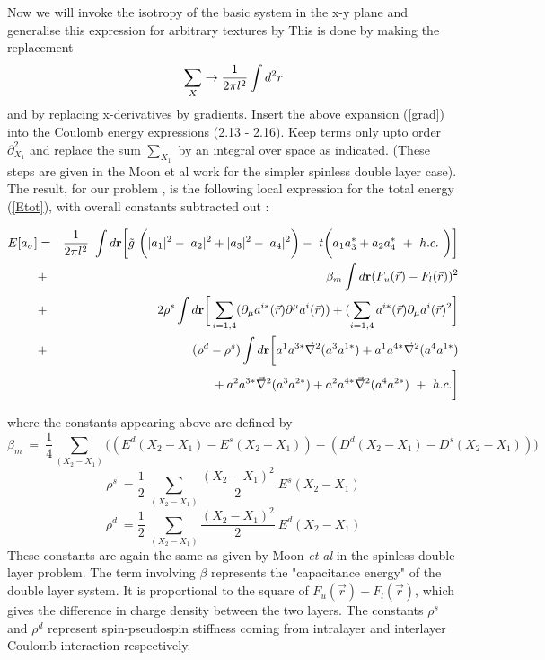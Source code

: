 Now we will invoke the isotropy of the basic system in the x-y plane
and generalise this expression for arbitrary textures by
This is done by
making the replacement
\begin{equation} \sum_{X} \rightarrow{1 \over 2\pi l^{2}} \int d^{2}r \end{equation}
and by replacing x-derivatives by gradients. 
Insert the above expansion (\ref{grad}) into the Coulomb energy 
expressions (2.13 - 2.16). 
Keep terms only upto order $\partial_{X_{1}}^2$ and replace the sum
$\sum_{X_{1}}$ by an integral over space as indicated. (These
steps are given in the Moon et al work \cite{Moon} for the simpler
spinless double layer case). The result, for our problem , is the following
local expression for the total energy (\ref{Etot}), with overall constants
subtracted out :

\begin{eqnarray} E [a_{\sigma}]
& = & 
\frac{1}{2 \pi l^{2}} \ \int d{\bf r} \bigg[ \tilde{g} \ 
\bigg(|a_{1}|^{2} - |a_{2}|^{2} + 
|a_{3}|^{2} - |a_{4}|^{2} \bigg) 
- \ t \bigg(a_{1} a_{3}^{*} + 
a_{2} a_{4}^{*} \ + \ h.c. \ \bigg) \bigg] \nonumber \\ 
&+& \beta_{m}
\int d{\bf r}( F_{u}(\vec{r}) - F_{l}( \vec{r}))^{2} \nonumber \\ 
&+&
2\rho^s \int d{\bf r} \bigg[
\sum_{i=1,4}(\partial_{\mu}a^{i\ast}(\vec{r})\partial^{\mu}a^{i}(\vec{r}))
+(\sum_{i=1,4}a^{i \ast}(\vec{r})\partial_{\mu}a^{i}(\vec{r})^{2}
\bigg] \nonumber \\
&+& (\rho^{d} - \rho^{s}) 
\int d{\bf r} 
\bigg[a^{1}a^{3 \ast} \vec{\nabla}^{2} (a^{3}a^{1 \ast})
+ a^{1}a^{4 \ast} \vec{\nabla}^{2} (a^{4}a^{1 \ast}) \nonumber \\ 
& & \mbox{} +
a^{2}a^{3 \ast} \vec{\nabla}^{2} (a^{3}a^{2 \ast}) +
a^{2}a^{4 \ast} \vec{\nabla}^{2} (a^{4}a^{2 \ast}) \  + \ h. c. \bigg]
\label{INTE} \end{eqnarray}

where the constants appearing above are defined by
\begin{equation} \beta_{m} \ = \  \frac{1}{4} \sum _{(X_{2} - X_{1})} \bigg( 
(E^{d}(X_{2} - X_{1}) - E^{s}(X_{2} - X_{1}))
- (D^{d}(X_{2} - X_{1}) -D^{s}(X_{2} - X_{1})) \bigg) \end{equation}
\begin{equation} \rho^{s} \ = \frac{1}{2}
\ \sum_{ (X_{2} -X_{1})}
\frac{(X_{2} -X_{1})^{2}}{2} \ E^{s}(X_{2} - X_{1})\end{equation}
\begin{equation} \rho^{d} \ = \frac{1}{2}
\ \sum_{(X_{2} -X_{1})}
\frac{(X_{2} -X_{1})^{2}}{2} \ E^{d}(X_{2} - X_{1})\end{equation}
These constants are again the same as given by Moon
{\it et al} \cite{Moon} in the spinless double layer problem.
The term involving $\beta$
represents the "capacitance energy" of the double layer system.
It is proportional to the square of $ F_{u}(\vec{r}) - F_{l}( \vec{r})$,
which gives the difference in charge density between the
two layers. The constants $\rho^{s}$ and $\rho^d$ represent
spin-pseudospin stiffness coming from intralayer and interlayer
Coulomb interaction respectively.

